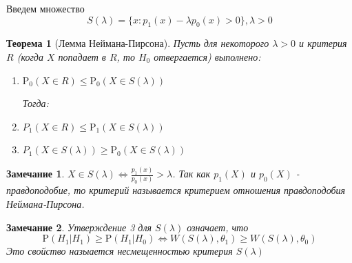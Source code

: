 \documentclass[12pt]{article}
\newtheorem*{remark}{Замечание}
\theoremstyle{basic_theorem}
\newtheorem{theorem}{Теорема}
\theoremstyle{name_theorem}
\def\P{
    \mathrm{P}
}
\begin{document}
Введем множество
$$S(\lambda) = \{x: p_1(x) - \lambda p_0(x) > 0\}, \lambda > 0$$

\begin{theorem}[Лемма Неймана-Пирсона]
    \label{th::lemma_N_P}
    Пусть для некоторого $\lambda > 0$ и критерия $R$
    (когда $X$ попадает в $R$, то $H_0$ отвергается)
    выполнено:
    \begin{enumerate}
        \item  $\P_0(X\in R) \leq \P_0(X\in S(\lambda))$

        Тогда: 
        \item  $P_1(X\in R) \leq \P_1(X\in S(\lambda))$
        \item  $P_1(X\in S(\lambda)) \geq \P_0(X\in S(\lambda))$
    \end{enumerate}
\end{theorem}
\begin{remark}
    $X\in S(\lambda) \Leftrightarrow \frac{p_1(x)}{p_0(x)} > \lambda$.
    Так как $p_1(X)$ и $p_0(X)$ - правдоподобие, то критерий
    называется критерием отношения правдоподобия Неймана-Пирсона.
\end{remark}
\begin{remark}
    Утверждение 3 для $S(\lambda)$
    означает, что
    $$\P(H_1 | H_1) \geq \P(H_1|H_0) \Leftrightarrow W(S(\lambda), \theta_1) \geq W(S(\lambda), \theta_0)$$
    Это свойство назыается несмещенностью критерия $S(\lambda)$
\end{remark}
\end{document}
